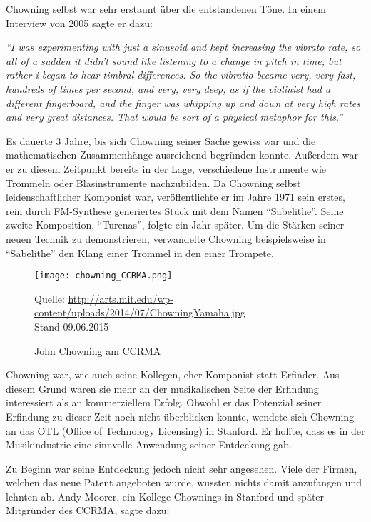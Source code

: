 Chowning selbst war sehr erstaunt über die entstandenen Töne. In einem Interview von 2005 sagte er dazu: 

\textit{``I was experimenting with just a sinusoid and kept increasing the vibrato rate, so all of a sudden it didn't sound like listening to a change in pitch in time, but rather i began to hear timbral differences. So the vibratio became very, very fast, hundreds of times per second, and very, very deep, as if the violinist had a different fingerboard, and the finger was whipping up and down at very high rates and very great distances. That would be sort of a physical metaphor for this.''}\cite[S. 34f.]{soundofinnovation}

Es dauerte 3 Jahre, bis sich Chowning seiner Sache gewiss war und die mathematischen Zusammenhänge ausreichend begründen konnte. Außerdem war er zu diesem Zeitpunkt bereits in der Lage, verschiedene Instrumente wie Trommeln oder Blasinstrumente nachzubilden. Da Chowning selbst leidenschaftlicher Komponist war, veröffentlichte er im Jahre 1971 sein erstes, rein durch FM-Synthese generiertes Stück mit dem Namen ``Sabelithe''. Seine zweite Komposition, ``Turenas'', folgte ein Jahr später.
Um die Stärken seiner neuen Technik zu demonstrieren, verwandelte Chowning beispielsweise in ``Sabelithe'' den Klang einer Trommel in den einer Trompete.\cite[S. 39]{soundofinnovation}
 
\begin{figure} [ht]
\centering
  \texttt{[image: chowning\_CCRMA.png]}
\caption{John Chowning am CCRMA}
\label{fig:chowningdx7}
Quelle: \url{ http://arts.mit.edu/wp-content/uploads/2014/07/ChowningYamaha.jpg} \\Stand 09.06.2015
\end{figure}
 
Chowning war, wie auch seine Kollegen, eher Komponist statt Erfinder. Aus diesem Grund waren sie mehr an der musikalischen Seite der Erfindung interessiert als an kommerziellem Erfolg. Obwohl er das Potenzial seiner Erfindung zu dieser Zeit noch nicht überblicken konnte, wendete sich Chowning an das OTL (Office of Technology Licensing) in Stanford. Er hoffte, dass es in der Musikindustrie eine sinnvolle Anwendung seiner Entdeckung gab.\cite[S. 42]{soundofinnovation}

 Zu Beginn war seine Entdeckung jedoch nicht sehr angesehen. Viele der Firmen, welchen das neue Patent angeboten wurde, wussten nichts damit anzufangen und lehnten ab. Andy Moorer, ein Kollege Chownings in Stanford und später Mitgründer des CCRMA, sagte dazu: 


